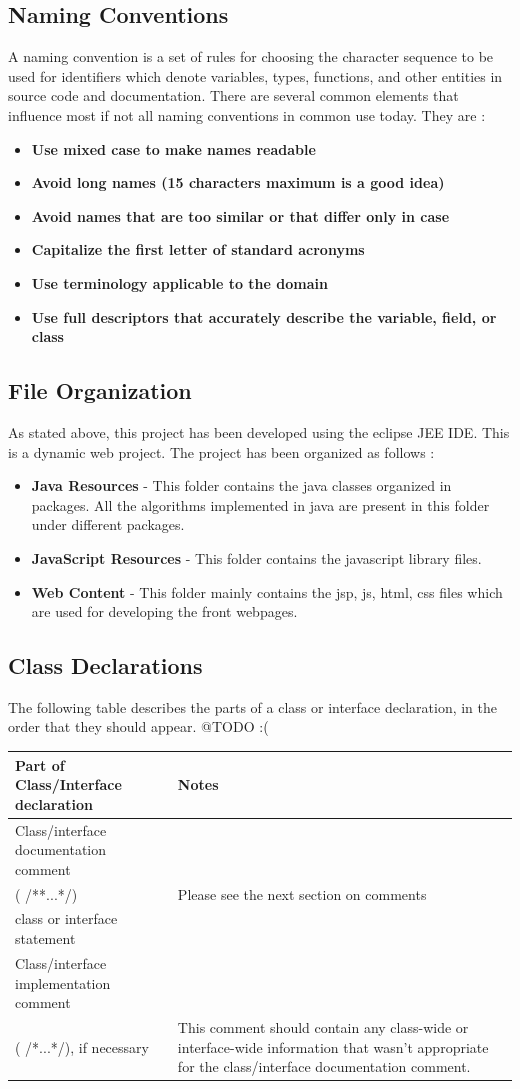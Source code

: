 \documentclass[12pt]{report}
\begin{document}
\subsection{Naming Conventions}
 A naming convention is a set of rules for choosing the character sequence to be used for identifiers which denote variables, types, functions, and other entities in source code and documentation.  There are several common elements that influence most if not all naming conventions in common use today. They are :
\begin{itemize}
\item \textbf{Use mixed case to make names readable}
\item \textbf{Avoid long names (15 characters maximum is a good idea)}
\item \textbf{Avoid names that are too similar or that differ only in case}
\item \textbf{Capitalize the first letter of standard acronyms}
\item \textbf{Use terminology applicable to the domain}
\item \textbf{Use full descriptors that accurately describe the variable, field, or class}
\end{itemize}
\subsection{File Organization}
As stated above, this project has been developed using the eclipse JEE IDE. This is a dynamic web project. The project has been organized as follows :
\begin{itemize}
\item\textbf{Java Resources} - This folder contains the java classes organized in packages. All the algorithms implemented in java are present in this folder under different packages.
\item\textbf{JavaScript Resources} - This folder contains the javascript library files.
\item\textbf{Web Content} - This folder mainly contains the jsp, js, html, css files which are used for developing the front webpages.
\end{itemize}
\subsection{Class Declarations}
The following table describes the parts of a class or interface declaration, in the order that they should appear. 
@TODO :(
\begin{tabular}{ |l|l| }
  \hline
  Part of Class/Interface declaration  & Notes \\ \hline
  Class/interface documentation comment\\ ( /**...*/) & Please see the next section on comments \\
  class or interface statement & \\
  Class/interface implementation comment\\ ( /*...*/), if necessary & This comment should contain any class-wide or interface-wide information that wasn't appropriate for the class/interface documentation comment.\\
  \hline
\end{tabular}
\end{document}
